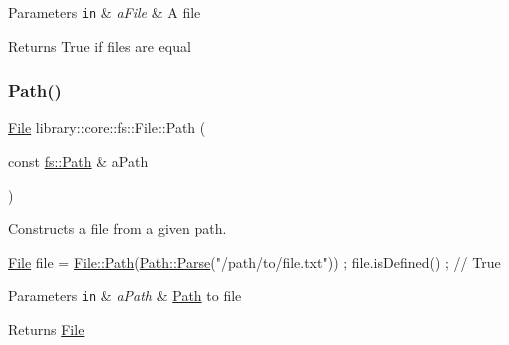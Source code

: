 \begin{DoxyParams}[1]{Parameters}
\mbox{\tt in}  & {\em a\+File} & A file \\
\hline
\end{DoxyParams}
\begin{DoxyReturn}{Returns}
True if files are equal 
\end{DoxyReturn}
\mbox{\label{classlibrary_1_1core_1_1fs_1_1_file_a72d6cdf8bb7e299889c6149e2b8a6cc7}} 
\subsubsection{\texorpdfstring{Path()}{Path()}}
{\footnotesize\ttfamily \hyperlink{classlibrary_1_1core_1_1fs_1_1_file}{File} library\+::core\+::fs\+::\+File\+::\+Path (\begin{DoxyParamCaption}\item[{const \hyperlink{classlibrary_1_1core_1_1fs_1_1_path}{fs\+::\+Path} \&}]{a\+Path }\end{DoxyParamCaption})\hspace{0.3cm}{\ttfamily [static]}}



Constructs a file from a given path. 


\begin{DoxyCode}
\hyperlink{classlibrary_1_1core_1_1fs_1_1_file_a6f3f0d79545ac9984c6f49432f0c6c39}{File} file = \hyperlink{classlibrary_1_1core_1_1fs_1_1_file_a72d6cdf8bb7e299889c6149e2b8a6cc7}{File::Path}(\hyperlink{classlibrary_1_1core_1_1fs_1_1_path_a6ba644b6609507e724c217bf2020f5ae}{Path::Parse}(\textcolor{stringliteral}{"/path/to/file.txt"})) ;
file.isDefined() ; \textcolor{comment}{// True}
\end{DoxyCode}



\begin{DoxyParams}[1]{Parameters}
\mbox{\tt in}  & {\em a\+Path} & \hyperlink{classlibrary_1_1core_1_1fs_1_1_path}{Path} to file \\
\hline
\end{DoxyParams}
\begin{DoxyReturn}{Returns}
\hyperlink{classlibrary_1_1core_1_1fs_1_1_file}{File} 
\end{DoxyReturn}
\mbox{\label{classlibrary_1_1core_1_1fs_1_1_file_a438408d402b994d76d4de3829ec67dbc}} 
